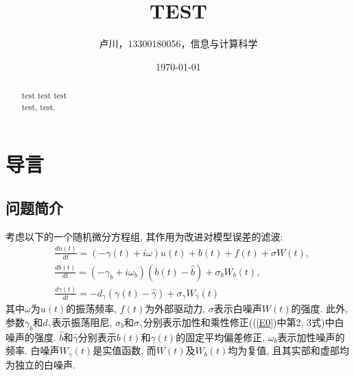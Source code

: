 \documentclass[notitlepage,cs4size,punct,oneside]{ctexrep}
\title{{\zihao{1}\heiti{} TEST}}
\author{卢川，13300180056，信息与计算科学}
\date{\today}
\numberwithin{equation}{section}
\theoremstyle{mystyle}
\begin{document}
\CTEXoptions[abstractname={摘要：}]
\CTEXoptions[bibname={\heiti 参考文献}]

\renewcommand{\thepage}{\roman{page}}
\setcounter{page}{1}
\tableofcontents\clearpage

\maketitle\renewcommand{\thepage}{\arabic{page}}
\thispagestyle{empty}\setcounter{page}{1}

\begin{abstract}
test test test \\
 test, test.
\end{abstract}

\section{导言}
\subsection{问题简介}
考虑以下的一个随机微分方程组, 其作用为改进对模型误差的滤波\cite{gershgorin2010test}:
\begin{equation} \label{E0}
\begin{split}
& \frac{du(t)}{dt} = (-\gamma(t)+i\omega)u(t)+b(t)+f(t)+\sigma W(t), \\
& \frac{db(t)}{dt} = (-\gamma_b+i\omega_b)(b(t)-\hat{b})+\sigma_b W_b(t), \\
& \frac{d\gamma(t)}{dt} = -d_\gamma(\gamma(t)-\hat{\gamma})+\sigma_\gamma W_\gamma(t)
\end{split}
\end{equation}
其中$\omega$为$u(t)$的振荡频率, $f(t)$为外部驱动力, $\sigma$表示白噪声$W(t)$的强度. 此外, 参数$\gamma_b$和$d_\gamma$表示振荡阻尼, $\sigma_b$和$\sigma_\gamma$分别表示加性和乘性修正((\ref{E0})中第2, 3式)中白噪声的强度. $\hat{b}$和$\hat{\gamma}$分别表示$b(t)$和$\gamma(t)$的固定平均偏差修正, $\omega_b$表示加性噪声的频率. 白噪声$W_\gamma(t)$是实值函数, 而$W(t)$及$W_b(t)$均为复值, 且其实部和虚部均为独立的白噪声. \\
\end{document}
